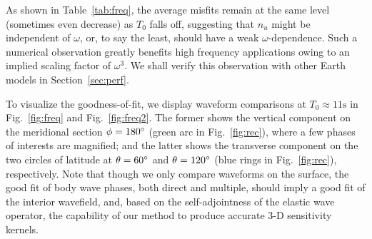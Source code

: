 \documentclass[extra]{gji}
\begin{document}
As shown in Table~\ref{tab:freq}, the average misfits remain at the same 
level (sometimes even decrease) as $T_0$ falls off, 
suggesting that $n_u$ might be independent of
$\omega$, or, to say the least, should have a weak $\omega$-dependence. 
Such a numerical observation greatly benefits high frequency applications
owing to an implied scaling factor of $\omega^3$. 
We shall verify this observation with other Earth models 
in Section~\ref{sec:perf}. 

To visualize the goodness-of-fit, we display waveform comparisons
at $T_0\approx11\text{s}$ in Fig.~\ref{fig:freq} and Fig.~\ref{fig:freq2}. 
The former shows the vertical component on the meridional section $\phi=180\hbox{$^\circ$}$
(green arc in Fig.~\ref{fig:rec}),
where a few phases of interests are magnified; 
and the latter shows the transverse component on the two 
circles of latitude at $\theta=60\hbox{$^\circ$}$ and $\theta=120\hbox{$^\circ$}$
(blue rings in Fig.~\ref{fig:rec}), respectively. 
Note that though we only compare waveforms on the surface,
the good fit of body wave phases, both direct and multiple, should imply 
a good fit of the interior wavefield, and, based on the self-adjointness 
of the elastic wave operator, the capability of our method to produce 
accurate 3-D sensitivity kernels. 
\end{document}

